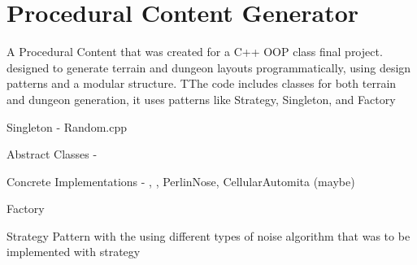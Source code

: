 \chapter{Procedural Content Generator}
\hypertarget{md_readme}{}\label{md_readme}
\label{md_readme_autotoc_md0}%
%


A Procedural Content  that was created for a C++ OOP class final project. designed to generate terrain and dungeon layouts programmatically, using design patterns and a modular structure. TThe code includes classes for both terrain and dungeon generation, it uses patterns like Strategy, Singleton, and Factory

Singleton -\/ Random.\+cpp

Abstract Classes -\/  

Concrete Implementations -\/ , , Perlin\+Nose, Cellular\+Automita (maybe)

Factory 

Strategy Pattern with the  using different types of noise algorithm that was to be implemented with  strategy 